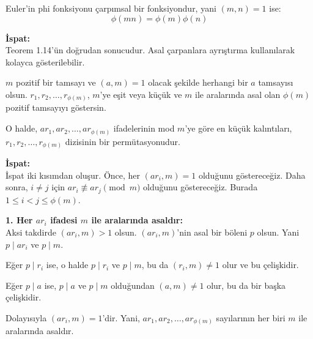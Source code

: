 \vspace{2em}

\begin{tcolorbox}[colback=yellow!5, colframe=yellow!50!black, title=\textbf{Lemma 1.6: Çarpımsal Fonksiyonlar}, fonttitle=\bfseries, sharp corners]
Euler'in phi fonksiyonu çarpımsal bir fonksiyondur, yani $(m,n)=1$ ise:
\[
\phi(mn) = \phi(m)\phi(n)
\]

\textbf{İspat:}\\
Teorem 1.14'ün doğrudan sonucudur. Asal çarpanlara ayrıştırma kullanılarak kolayca gösterilebilir.
\end{tcolorbox}

\vspace{2em}

\begin{tcolorbox}[colback=green!5, colframe=green!40!black, title=\textbf{Lemma 1.6: Permütasyon Özelliği}, fonttitle=\bfseries, sharp corners]
$m$ pozitif bir tamsayı ve $(a, m) = 1$ olacak şekilde herhangi bir $a$ tamsayısı olsun. $r_1, r_2, \ldots, r_{\phi(m)}$, $m$'ye eşit veya küçük ve $m$ ile aralarında asal olan $\phi(m)$ pozitif tamsayıyı göstersin. 

O halde, $ar_1, ar_2, \ldots, ar_{\phi(m)}$ ifadelerinin mod $m$'ye göre en küçük kalıntıları, $r_1, r_2, \ldots, r_{\phi(m)}$ dizisinin bir permütasyonudur.

\vspace{0.5em}

\textbf{İspat:} \\
İspat iki kısımdan oluşur. Önce, her $(ar_i, m) = 1$ olduğunu göstereceğiz. Daha sonra, $i \ne j$ için $ar_i \not\equiv ar_j \pmod{m}$ olduğunu göstereceğiz. Burada $1 \leq i < j \leq \phi(m)$.

\textbf{1. Her $ar_i$ ifadesi $m$ ile aralarında asaldır:} \\
Aksi takdirde $(ar_i, m) > 1$ olsun. $(ar_i, m)$'nin asal bir böleni $p$ olsun. Yani $p \mid ar_i$ ve $p \mid m$.

Eğer $p \mid r_i$ ise, o halde $p \mid r_i$ ve $p \mid m$, bu da $(r_i, m) \ne 1$ olur ve bu çelişkidir. 

Eğer $p \mid a$ ise, $p \mid a$ ve $p \mid m$ olduğundan $(a, m) \ne 1$ olur, bu da bir başka çelişkidir. 

Dolayısıyla $(ar_i, m) = 1$'dir. Yani, $ar_1, ar_2, \ldots, ar_{\phi(m)}$ sayılarının her biri $m$ ile aralarında asaldır.

\vspace{0.5em}


\end{tcolorbox}
